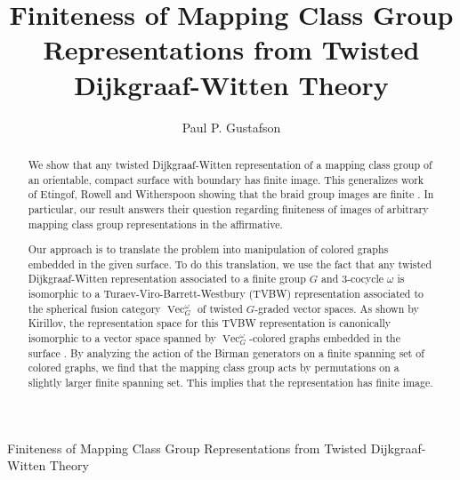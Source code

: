 \documentclass{amsart}
\DeclareMathOperator{\Vect}{Vec}
\begin{document}
{Finiteness of Mapping Class Group Representations from Twisted Dijkgraaf-Witten Theory}


\title{Finiteness of Mapping Class Group Representations from Twisted Dijkgraaf-Witten Theory}

\author{Paul P. Gustafson}
\address{Department of Mathematics,
    Texas A\&M University,
    College Station, TX
    U.S.A.}

\maketitle

\begin{abstract}
We show that any twisted Dijkgraaf-Witten representation of a mapping class group of an orientable, compact surface with boundary has finite image. This generalizes work of Etingof, Rowell and Witherspoon showing that the braid group images are finite \cite{erw}.  In particular, our result answers their question regarding finiteness of images of arbitrary mapping class group representations in the affirmative.

Our approach is to translate the problem into manipulation of colored graphs embedded in the given surface. To do this translation, we use the fact that any twisted Dijkgraaf-Witten representation associated to a finite group $G$ and 3-cocycle $\omega$ is isomorphic to a Turaev-Viro-Barrett-Westbury (TVBW) representation associated to the spherical fusion category $\Vect_G^\omega$ of twisted $G$-graded vector spaces. As shown by Kirillov, the representation space for this TVBW representation is canonically isomorphic to a vector space spanned by $\Vect_G^\omega$-colored graphs embedded in the surface \cite{kirillovStringNets}.   By analyzing the action of the Birman generators \cite{birman} on a finite spanning set of colored graphs, we find that the mapping class group acts by permutations on a slightly larger finite spanning set.  This implies that the representation has finite image.
\end{abstract}


\end{document}
